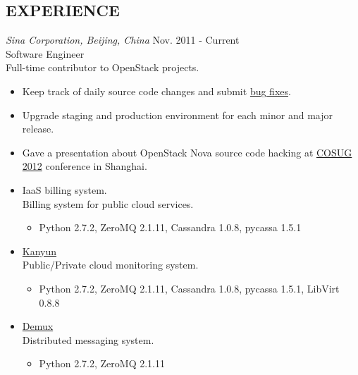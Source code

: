 \documentclass[line,margin]{res}
\begin{document}
\begin{resume}
\section{EXPERIENCE} {\sl Sina Corporation, Beijing, China} \hfill Nov. 2011 - Current \\
                     Software Engineer \\
                     Full-time contributor to OpenStack projects.
                     \begin{itemize}  \itemsep 2pt %
                     \item Keep track of daily source code changes and submit \href{http://bitly.com/y9yqm0}{bug fixes}.
                     \item Upgrade staging and production environment for each minor and major release.
                     \item Gave a presentation about OpenStack Nova source code hacking at
                           \href{http://bitly.com/wnDSHV}{COSUG 2012} conference in Shanghai.
                     \item IaaS billing system. \\ Billing system for public cloud services.
                           \begin{itemize}
                               \item Python 2.7.2, ZeroMQ 2.1.11, Cassandra 1.0.8, pycassa 1.5.1
                           \end{itemize}
                     \item \href{http://github.com/lzyeval/kanyun}{Kanyun} \\ Public/Private cloud monitoring system.
                           \begin{itemize}
                               \item Python 2.7.2, ZeroMQ 2.1.11, Cassandra 1.0.8, pycassa 1.5.1, LibVirt 0.8.8
                           \end{itemize}
                     \item \href{http://github.com/lzyeval/demux}{Demux} \\ Distributed messaging system.
                           \begin{itemize}
                               \item Python 2.7.2, ZeroMQ 2.1.11
                           \end{itemize}
                     \end{itemize}


\end{resume}
\end{document}
